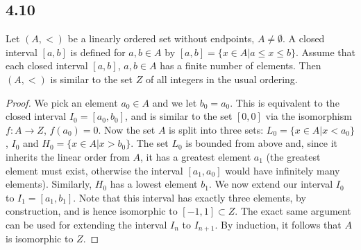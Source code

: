 \subsection*{4.10}
Let $(A, <)$ be a linearly ordered set without endpoints, $A \neq \emptyset$. A closed interval $[a,b]$ is defined for $a,b \in A$ by $[a,b] = \{x \in A| a \leq x \leq b\}$. Assume that each closed interval $[a,b]$, $a,b \in A$ has a finite number of elements. Then $(A,<)$ is similar to the set $Z$ of all integers in the usual ordering.

\begin{proof}

We pick an element $a_0 \in A$ and we let $b_0 = a_0$. This is equivalent to the closed interval $I_0 = [a_0, b_0]$, and is similar to the set $[0,0]$ via the isomorphism $f:A \rightarrow Z$, $f(a_0) = 0$. Now the set $A$ is split into three sets: $L_0 = \{x \in A| x < a_0\}$, $I_0$ and $H_0 = \{x \in A | x > b_0\}$. The set $L_0$ is bounded from above and, since it inherits the linear order from $A$, it has a greatest element $a_1$ (the greatest element must exist, otherwise the interval $[a_1, a_0]$ would have infinitely many elements). Similarly, $H_0$ has a lowest element $b_1$. We now extend our interval $I_0$ to $I_1 = [a_1, b_1]$. Note that this interval has exactly three elements, by construction, and is hence isomorphic to $[-1, 1] \subset Z$. The exact same argument can be used for extending the interval $I_n$ to $I_{n+1}$. By induction, it follows that $A$ is isomorphic to $Z$.

\end{proof}



